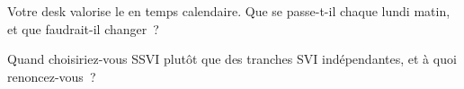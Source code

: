 \begin{interviewq}\label{iq:dv:parametrising-the-surface:5}
Votre desk valorise le  en temps calendaire. Que se passe-t-il chaque lundi matin, et que faudrait-il changer~?
\end{interviewq}

\begin{interviewq}\label{iq:dv:parametrising-the-surface:6}
Quand choisiriez-vous SSVI plutôt que des tranches SVI indépendantes, et à quoi renoncez-vous~?
\end{interviewq}
